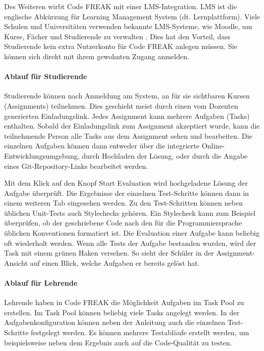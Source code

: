 Des Weiteren wirbt Code FREAK mit einer LMS-Integration. LMS ist die englische
Abkürzung für Learning Management System (dt. Lernplattform). Viele Schulen und
Universitäten verwenden bekannte LMS-Systeme, wie Moodle, um Kurse, Fächer und
Studierende zu verwalten \parencite{moodle}.
Dies hat den Vorteil, dass Studierende kein extra Nutzerkonto für Code FREAK
anlegen müssen. Sie können sich direkt mit ihrem gewohnten Zugang anmelden.

\paragraph{Ablauf für Studierende}
Studierende können nach Anmeldung am System, an für sie sichtbaren Kursen
(Assignments) teilnehmen. Dies geschieht meist durch einen vom Dozenten
generierten Einladungslink. Jedes Assignment kann mehrere Aufgaben (Tasks)
enthalten. Sobald der Einladungslink zum Assignment akzeptiert
wurde, kann die teilnehmende Person alle Tasks aus dem Assignment sehen und
bearbeiten. Die einzelnen Aufgaben können dann entweder über die integrierte
Online-Entwicklungsumgebung, durch Hochladen der Lösung, oder durch die Angabe
eines Git-Repository-Links bearbeitet werden.

Mit dem Klick auf den Knopf \glqq Start Evaluation\grqq{} wird hochgeladene
Lösung der Aufgabe überprüft. Die Ergebnisse der einzelnen Test-Schritte können
dann in einem weiteren Tab eingesehen werden. Zu den Test-Schritten können neben
üblichen Unit-Tests auch Stylechecks gehören. Ein Stylecheck kann zum Beispiel
überprüfen, ob der geschriebene Code nach den für die Programmiersprache
üblichen Konventionen formatiert ist. Die Evaluation einer Aufgabe kann beliebig
oft wiederholt werden. Wenn alle Tests der Aufgabe bestanden wurden, wird der
Task mit einem grünen Haken versehen. So sieht der Schüler in der
Assignment-Ansicht auf einen Blick, welche Aufgaben er bereits gelöst hat.

\paragraph{Ablauf für Lehrende}
Lehrende haben in Code FREAK die Möglichkeit Aufgaben im Task Pool zu
erstellen. Im Task Pool können beliebig viele Tasks angelegt werden. In der
Aufgabenkonfiguration können neben der Anleitung auch die einzelnen
Test-Schritte festgelegt werden. Es können mehrere Testabläufe erstellt werden,
um beispielsweise neben dem Ergebnis auch auf die Code-Qualität zu testen.

